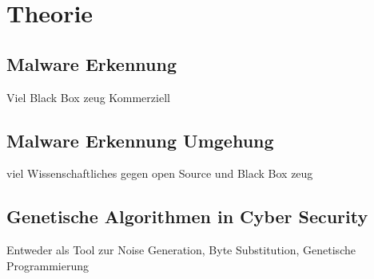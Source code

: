 \chapter{Theorie}
\label{chapter:theorie}

\section{Malware Erkennung}
Viel Black Box zeug Kommerziell

\section{Malware Erkennung Umgehung}
viel Wissenschaftliches gegen open Source und Black Box zeug

\section{Genetische Algorithmen in Cyber Security}
Entweder als Tool zur Noise Generation, Byte Substitution, Genetische Programmierung 